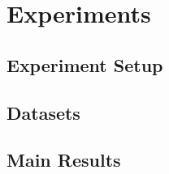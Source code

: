 \section{Experiments}

\subsection{Experiment Setup}

\subsection{Datasets}

\subsection{Main Results}


